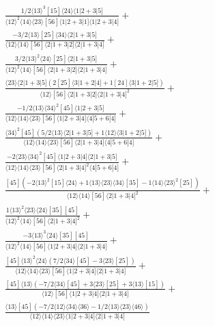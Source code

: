 \documentclass[varwidth, border=5pt]{standalone}
\begin{document}
\begin{my}
$\begin{gathered}
\scriptscriptstyle\frac{1/2⟨13⟩^3[15]⟨24⟩⟨1|2+3|5]}{⟨12⟩^2⟨14⟩⟨23⟩[56]⟨1|2+3|1]⟨1|2+3|4]}+\\
\scriptscriptstyle\frac{-3/2⟨13⟩[25]⟨34⟩⟨2|1+3|5]}{⟨12⟩⟨14⟩[56]⟨2|1+3|2]⟨2|1+3|4]}+\\
\scriptscriptstyle\frac{3/2⟨13⟩^2⟨24⟩[25]⟨2|1+3|5]}{⟨12⟩^2⟨14⟩[56]⟨2|1+3|2]⟨2|1+3|4]}+\\
\scriptscriptstyle\frac{⟨23⟩⟨2|1+3|5](2[25]⟨3|1+2|4]+1[24]⟨3|1+2|5])}{⟨12⟩[56]⟨2|1+3|2]⟨2|1+3|4]^2}+\\
\scriptscriptstyle\frac{-1/2⟨13⟩⟨34⟩^2[45]⟨1|2+3|5]}{⟨12⟩⟨14⟩⟨23⟩[56]⟨1|2+3|4]⟨4|5+6|4]}+\\
\scriptscriptstyle\frac{⟨34⟩^2[45](5/2⟨13⟩⟨2|1+3|5]+1⟨12⟩⟨3|1+2|5])}{⟨12⟩⟨14⟩⟨23⟩[56]⟨2|1+3|4]⟨4|5+6|4]}+\\
\scriptscriptstyle\frac{-2⟨23⟩⟨34⟩^2[45]⟨1|2+3|4]⟨2|1+3|5]}{⟨12⟩⟨14⟩⟨23⟩[56]⟨2|1+3|4]^2⟨4|5+6|4]}+\\
\scriptscriptstyle\frac{[45](-2⟨13⟩^2[15]⟨24⟩+1⟨13⟩⟨23⟩⟨34⟩[35]-1⟨14⟩⟨23⟩^2[25])}{⟨12⟩⟨14⟩[56]⟨2|1+3|4]^2}+\\
\scriptscriptstyle\frac{1⟨13⟩^2⟨23⟩⟨24⟩[35][45]}{⟨12⟩^2⟨14⟩[56]⟨2|1+3|4]^2}+\\
\scriptscriptstyle\frac{-3⟨13⟩^3⟨24⟩[35][45]}{⟨12⟩^2⟨14⟩[56]⟨1|2+3|4]⟨2|1+3|4]}+\\
\scriptscriptstyle\frac{[45]⟨13⟩^2⟨24⟩(7/2⟨34⟩[45]-3⟨23⟩[25])}{⟨12⟩⟨14⟩⟨23⟩[56]⟨1|2+3|4]⟨2|1+3|4]}+\\
\scriptscriptstyle\frac{[45]⟨13⟩(-7/2⟨34⟩[45]+3⟨23⟩[25]+3⟨13⟩[15])}{⟨12⟩[56]⟨1|2+3|4]⟨2|1+3|4]}+\\
\scriptscriptstyle\frac{⟨13⟩[45](-7/2⟨12⟩⟨34⟩⟨36⟩-1/2⟨13⟩⟨23⟩⟨46⟩)}{⟨12⟩⟨14⟩⟨23⟩⟨1|2+3|4]⟨2|1+3|4]}\phantom{+}
\end{gathered}$
\end{my}
\end{document}

